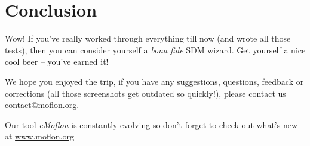 \chapter{Conclusion} 

Wow!  If you've really worked through everything till now (and wrote all those
tests), then you can consider yourself a \emph{bona fide} SDM wizard.  Get
yourself a nice cool beer -- you've earned it!

We hope you enjoyed the trip, if you have any suggestions, questions,
feedback or corrections (all those screenshots get outdated so quickly!), please
contact us \url{contact@moflon.org}.

Our tool \emph{eMoflon} is constantly evolving so don't forget to check out
what's new at \url{www.moflon.org}

 